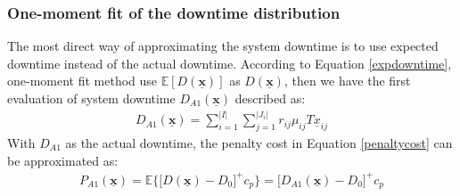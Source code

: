 \documentclass[preprint,12pt]{elsarticle}
\begin{document}
%
\subsubsection{One-moment fit of the downtime distribution}

The most direct way of approximating the system downtime is to use expected downtime instead of the actual downtime. According to Equation \eqref{expdowntime}, one-moment fit method use $\mathbb{E}[D(\boldsymbol{\underline{x}})]$ as $D(\boldsymbol{\underline{x}})$, then we have the first evaluation of system downtime $D_{A1}(\boldsymbol{\underline{x}})$ described as:
\begin{eqnarray}
D_{A1}(\boldsymbol{\underline{x}}) = \sum^{\lvert I \rvert}_{i=1} \sum_{j=1}^{\lvert J_{i} \rvert}{r_{ij}\mu_{ij}T\underline{x}_{ij}} 
\label{approximation1}
\end{eqnarray}
With $D_{A1}$ as the actual downtime, the penalty cost in Equation \eqref{penaltycost} can be approximated as:
\begin{eqnarray}
P_{A1}(\boldsymbol{\underline{x}}) =\mathbb{E}\bigg\{\bigg[D(\boldsymbol{\underline{x}})-D_{0}\bigg]^{+}c_{p}\bigg\} = \bigg[D_{A1}(\boldsymbol{\underline{x}})-D_{0} \bigg]^{+}c_p \label{penapproximation1}
\end{eqnarray}
\end{document}
